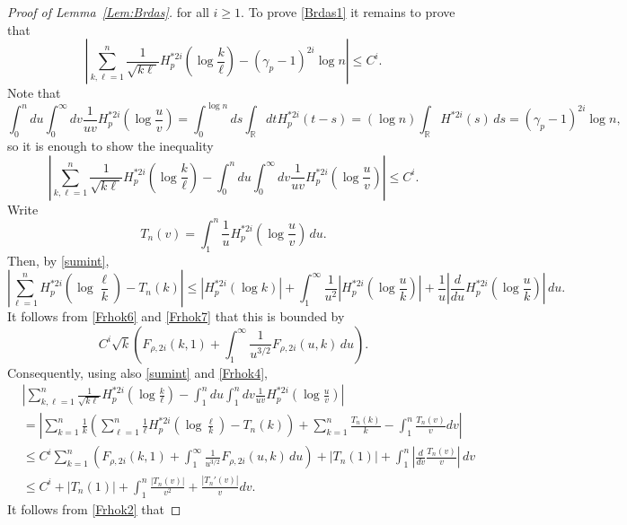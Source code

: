 \documentclass{article}
\numberwithin{equation}{section}
\numberwithin{figure}{section}
\theoremstyle{plain}
\theoremstyle{plain}
\numberwithin{thm}{section}
\theoremstyle{remark}
\newcommand{\R}{\mathbb{R}}
\let \le \leqslant
\let \ge \geqslant
\begin{document}
\begin{proof}[Proof of Lemma~\ref{Lem:Brdas}]
for all $i\ge 1$. To prove \eqref{Brdas1} it remains to prove that
\begin{equation}\label{Brdasstep}
    \left|\sum_{k,\ell=1}^n\frac 1{\sqrt{k\ell}}H_p^{*2i}(\log\frac k\ell)-(\gamma_p-1)^{2i}\log n\right|\le C^i.
\end{equation}
Note that
\begin{equation*}
    \int_0^ndu\int_0^\infty dv \frac 1{uv}H_p^{*2i}(\log\frac uv)=\int_0^{\log n}ds\int_\R dt H_p^{*2i}(t-s)=(\log n)\int_\R H^{*2i}(s)\,ds=(\gamma_p-1)^{2i}\log n,
\end{equation*}
so it is enough to show the inequality
\begin{equation}\label{Brdasstep2}
    \left|\sum_{k,\ell=1}^n\frac 1{\sqrt{k\ell}}H_p^{*2i}(\log\frac k\ell)-
\int_0^ndu\int_0^\infty dv \frac 1{uv}H_p^{*2i}(\log\frac uv)\right|\le C^i.
\end{equation}
Write
\begin{equation}\label{Tnv}
    T_n(v)=\int_1^n\frac 1uH_p^{*2i}(\log\frac uv)\,du.
\end{equation}
Then, by \eqref{sumint},
\begin{equation*}
    \left|\sum_{\ell=1}^nH_p^{*2i}(\log\frac \ell k)-T_n(k)\right|\le |H_p^{*2i}(\log k)|+\int_1^\infty \frac 1{u^2}\left|H_p^{*2i}(\log\frac uk)\right|+\frac 1u\left|\frac{d}{du}H_p^{*2i}(\log\frac uk)\right|\,du.
\end{equation*}
It follows from \eqref{Frhok6} and \eqref{Frhok7} that this is bounded by
\begin{equation*}
    C^i\sqrt{k}\left(F_{\rho,2i}(k,1)+\int_1^\infty\frac 1{u^{3/2}}F_{\rho,2i}(u,k)\,du\right).
\end{equation*}
Consequently, using also \eqref{sumint} and \eqref{Frhok4},
\begin{align*}
 &\left|\sum_{k,\ell=1}^n\frac 1{\sqrt{k\ell}}H_p^{*2i}(\log\frac k\ell)-
\int_1^ndu\int_1^n dv \frac 1{uv}H_p^{*2i}(\log\frac uv)\right| \\
&=  \left|\sum_{k=1}^n\frac 1k\left(\sum_{\ell=1}^n\frac 1\ell H_p^{*2i}(\log\frac \ell k)-T_n(k)\right)+\sum_{k=1}^n\frac{T_n(k)}k-\int_1^n\frac{T_n(v)}vdv\right|\\
&\le C^i\sum_{k=1}^n\left(F_{\rho,2i}(k,1)+\int_1^\infty\frac 1{u^{3/2}}F_{\rho,2i}(u,k)\,du\right)+|T_n(1)|+\int_1^n \left|\frac{d}{dv}\frac{T_n(v)}v\right|\,dv\\
&\le C^i+|T_n(1)|+\int_1^n\frac{|T_n(v)|}{v^2}+\frac{|T_n'(v)|}{v}dv.
\end{align*}
It follows from \eqref{Frhok2} that

\end{proof}
\end{document}
